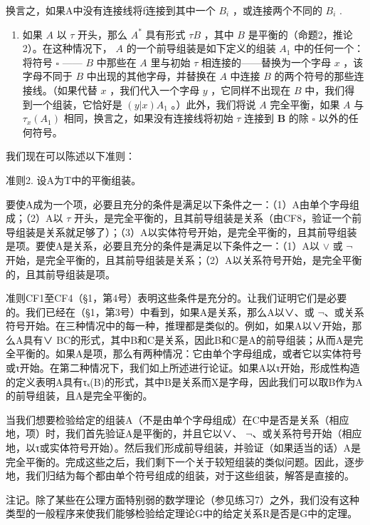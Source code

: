 换言之，如果A中没有连接线将f连接到其中一个 \(B_{i}\) ，或连接两个不同的 \(B_{i}\) .

\begin{enumerate}
\def\labelenumi{(\arabic{enumi})}
\setcounter{enumi}{1}
\tightlist
\item
  如果 \(A\) 以 \(\tau\) 开头，那么 \(A^*\) 具有形式 \(\tau B\) ，其中 \(B\) 是平衡的（命题2，推论2）。在这种情况下， \(A\) 的一个前导组装是如下定义的组装 \(A_1\) 中的任何一个：将符号 \(\square\) —— \(B\) 中那些在 \(A\) 里与初始 \(\tau\) 相连接的——替换为一个字母 \(x\) ，该字母不同于 \(B\) 中出现的其他字母，并替换在 \(A\) 中连接 \(B\) 的两个符号的那些连接线。（如果代替 \(x\) ，我们代入一个字母 \(y\) ，它同样不出现在 \(B\) 中，我们得到一个组装，它恰好是 \((y|x)A_1\) 。）此外，我们将说 \(A\) 完全平衡，如果 \(A\) 与 \(\tau_{x}(A_1)\) 相同，换言之，如果没有连接线将初始 \(\tau\) 连接到 \(\pmb{B}\) 的除 \(\square\) 以外的任何符号。
\end{enumerate}

我们现在可以陈述以下准则：

准则2. 设A为T中的平衡组装。

要使A成为一个项，必要且充分的条件是满足以下条件之一：（1）A由单个字母组成；（2）A以 \(\tau\) 开头，是完全平衡的，且其前导组装是关系（由CF8，验证一个前导组装是关系就足够了）；（3）A以实体符号开始，是完全平衡的，且其前导组装是项。要使A是关系，必要且充分的条件是满足以下条件之一：（1）A以 \(\vee\) 或 \(\neg\) 开始，是完全平衡的，且其前导组装是关系；（2）A以关系符号开始，是完全平衡的，且其前导组装是项。

准则CF1至CF4（§1，第4号）表明这些条件是充分的。让我们证明它们是必要的。我们已经在（§1，第3号）中看到，如果A是关系，那么A以∨、或 \(\neg\)、或关系符号开始。在三种情况中的每一种，推理都是类似的。例如，如果A以∨开始，那么A具有∨ BC的形式，其中B和C是关系，因此B和C是A的前导组装；从而A是完全平衡的。如果A是项，那么有两种情况：它由单个字母组成，或者它以实体符号或τ开始。在第二种情况下，我们如上所述进行论证。如果A以τ开始，形成性构造的定义表明A具有τₓ(B)的形式，其中B是关系而X是字母，因此我们可以取B作为A的前导组装，且A是完全平衡的。

当我们想要检验给定的组装A（不是由单个字母组成）在C中是否是关系（相应地，项）时，我们首先验证A是平衡的，并且它以∨、 \(\neg\)、或关系符号开始（相应地，以τ或实体符号开始）。然后我们形成前导组装，并验证（如果适当的话）A是完全平衡的。完成这些之后，我们剩下一个关于较短组装的类似问题。因此，逐步地，我们归结为每个都由单个符号组成的组装，对于这些组装，解答是直接的。

注记。除了某些在公理方面特别弱的数学理论（参见练习7）之外，我们没有这种类型的一般程序来使我们能够检验给定理论G中的给定关系R是否是G中的定理。

